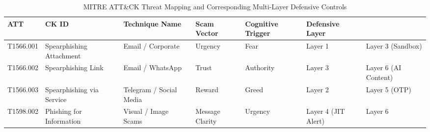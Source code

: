 \begin{table}
\caption{MITRE ATT&CK Threat Mapping and Corresponding Multi-Layer Defensive Controls}
\label{tab:mitre_matrix}
\begin{tabular}{lllll}
\toprule
ATT&CK ID & Technique Name & Scam Vector & Cognitive Trigger & Defensive Layer \\
\midrule
T1566.001 & Spearphishing Attachment & Email / Corporate & Urgency & Fear & Layer 1 & Layer 3 (Sandbox) \\
T1566.002 & Spearphishing Link & Email / WhatsApp & Trust & Authority & Layer 3 & Layer 6 (AI Content) \\
T1566.003 & Spearphishing via Service & Telegram / Social Media & Reward & Greed & Layer 2 & Layer 5 (OTP) \\
T1598.002 & Phishing for Information & Visual / Image Scams & Message Clarity & Urgency & Layer 4 (JIT Alert) & Layer 6 \\
\bottomrule
\end{tabular}
\end{table}
